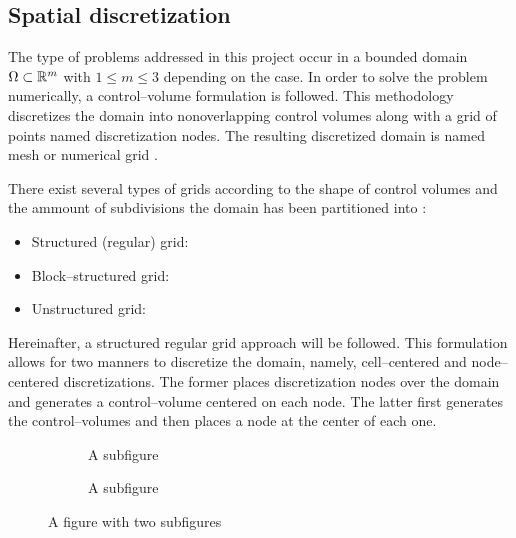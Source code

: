 
\subsection{Spatial discretization}

The type of problems addressed in this project occur in a bounded domain $\Omega \subset \mathbb{R}^m$ with $1 \leq m \leq 3$ depending on the case. In order to solve the problem numerically, a control--volume formulation is followed. This methodology discretizes the domain into nonoverlapping control volumes along with a grid of points named discretization nodes. The resulting discretized domain is named mesh or numerical grid \cite{patankar2008numerical}.

There exist several types of grids according to the shape of control volumes and the ammount of subdivisions the domain has been partitioned into \cite{ferziger2002computational}:
\begin{itemize}
	\item Structured (regular) grid: 
	\item Block--structured grid:
	\item Unstructured grid:
\end{itemize}

Hereinafter, a structured regular grid approach will be followed. This formulation allows for two manners to discretize the domain, namely, cell--centered and node--centered discretizations. The former places discretization nodes over the domain and generates a control--volume centered on each node. The latter first generates the control--volumes and then places a node at the center of each one.

\begin{figure}[h]
	\centering
	\begin{subfigure}{.5\textwidth}
		\centering
		\caption{A subfigure}
		\label{fig:sub1}
	\end{subfigure}%
	\begin{subfigure}{.5\textwidth}
		\centering
		\caption{A subfigure}
		\label{fig:sub2}
	\end{subfigure}
	\caption{A figure with two subfigures}
	\label{fig:face_node_centered_discretization_comparison}
\end{figure}
